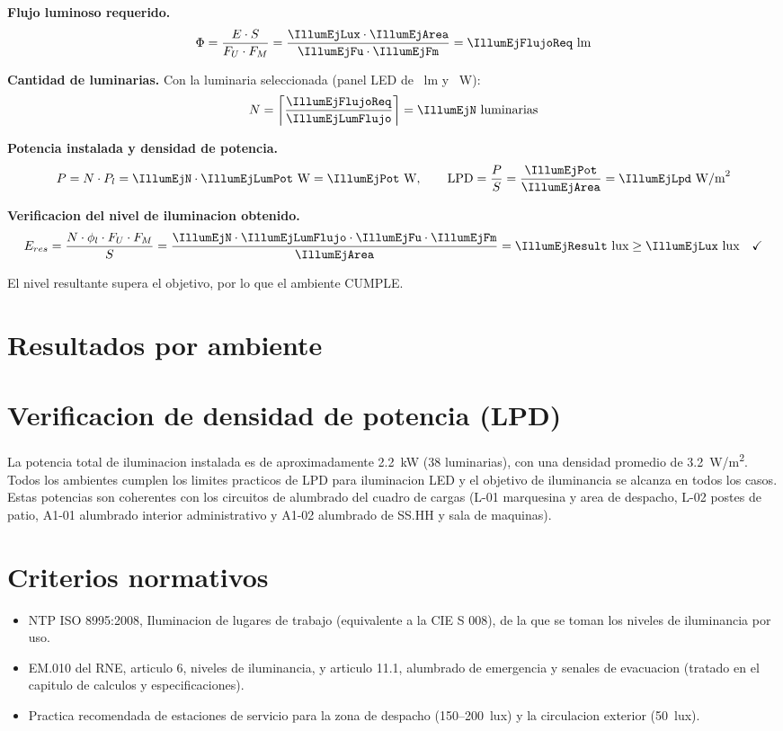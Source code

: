 \textbf{Flujo luminoso requerido.}
\[
\Phi = \frac{E \cdot S}{F_U \cdot F_M}
     = \frac{\IllumEjLux \cdot \IllumEjArea}{\IllumEjFu \cdot \IllumEjFm}
     = \IllumEjFlujoReq~\text{lm}
\]

\textbf{Cantidad de luminarias.} Con la luminaria seleccionada (panel LED de
\IllumEjLumFlujo~lm y \IllumEjLumPot~W):
\[
N = \left\lceil \frac{\IllumEjFlujoReq}{\IllumEjLumFlujo} \right\rceil
  = \IllumEjN~\text{luminarias}
\]

\textbf{Potencia instalada y densidad de potencia.}
\[
P = N \cdot P_l = \IllumEjN \cdot \IllumEjLumPot~\text{W} = \IllumEjPot~\text{W},
\qquad
\text{LPD} = \frac{P}{S} = \frac{\IllumEjPot}{\IllumEjArea} = \IllumEjLpd~\text{W/m}^2
\]

\textbf{Verificacion del nivel de iluminacion obtenido.}
\[
E_{res} = \frac{N \cdot \phi_l \cdot F_U \cdot F_M}{S}
        = \frac{\IllumEjN \cdot \IllumEjLumFlujo \cdot \IllumEjFu \cdot \IllumEjFm}{\IllumEjArea}
        = \IllumEjResult~\text{lux} \geq \IllumEjLux~\text{lux}
        \quad \checkmark
\]

El nivel resultante supera el objetivo, por lo que el ambiente CUMPLE.

\section{Resultados por ambiente}
\IllumNotaN

\ILLUMTAB

\section{Verificacion de densidad de potencia (LPD)}
La potencia total de iluminacion instalada es de aproximadamente
\SI{2.2}{kW} (38 luminarias), con una densidad promedio de
\SI{3.2}{W/m^2}. Todos los ambientes cumplen los limites practicos de LPD para
iluminacion LED y el objetivo de iluminancia se alcanza en todos los casos.
Estas potencias son coherentes con los circuitos de alumbrado del cuadro de
cargas (L-01 marquesina y area de despacho, L-02 postes de patio, A1-01
alumbrado interior administrativo y A1-02 alumbrado de SS.HH y sala de
maquinas).

\section{Criterios normativos}
\begin{itemize}
\item NTP ISO 8995:2008, Iluminacion de lugares de trabajo (equivalente a la
  CIE S 008), de la que se toman los niveles de iluminancia por uso.
\item EM.010 del RNE, articulo 6, niveles de iluminancia, y articulo 11.1,
  alumbrado de emergencia y senales de evacuacion (tratado en el capitulo de
  calculos y especificaciones).
\item Practica recomendada de estaciones de servicio para la zona de despacho
  (150--200~lux) y la circulacion exterior (50~lux).
\end{itemize}
